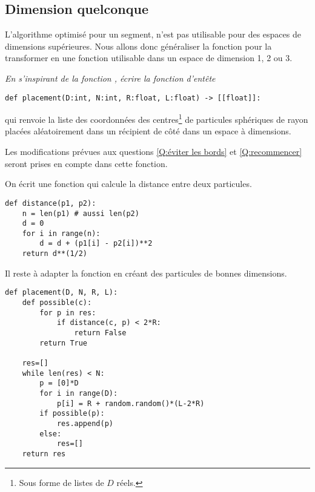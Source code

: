 \subsection{Dimension quelconque}
L'algorithme optimisé pour un segment, n'est pas utilisable pour des espaces de dimensions supérieures. Nous allons donc généraliser la fonction  pour la transformer en une fonction
utilisable dans un espace de dimension 1, 2 ou 3.
\begin{Exercise}\it 
En s'inspirant de la fonction , écrire la
fonction d'entête
\begin{lstlisting}
def placement(D:int, N:int, R:float, L:float) -> [[float]]:
\end{lstlisting}
qui renvoie la liste des coordonnées des centres\footnote{Sous forme de listes de $D$ réels.} de  particules sphériques de rayon  placées aléatoirement dans un récipient de
côté  dans un espace à  dimensions. 

Les modifications prévues aux questions \ref{Q:éviter les bords} et \ref{Q:recommencer} seront prises en compte dans cette fonction.
\end{Exercise}
\begin{Answer}
On écrit une fonction  qui calcule la distance entre deux particules.
\begin{lstlisting}
def distance(p1, p2):
    n = len(p1) # aussi len(p2)
    d = 0
    for i in range(n):
        d = d + (p1[i] - p2[i])**2
    return d**(1/2)
\end{lstlisting}
Il reste à adapter la fonction  en créant des particules de bonnes dimensions.
\begin{lstlisting}
def placement(D, N, R, L):
    def possible(c):
        for p in res:
            if distance(c, p) < 2*R: 
                return False
        return True
        
    res=[]
    while len(res) < N:
        p = [0]*D
        for i in range(D):
            p[i] = R + random.random()*(L-2*R)
        if possible(p): 
            res.append(p)
        else:
            res=[]
    return res
\end{lstlisting}
\end{Answer}
\newpage
